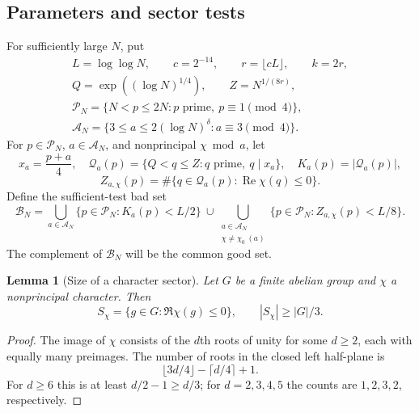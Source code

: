 \documentclass[11pt]{article}
\newtheorem{lemma}[theorem]{Lemma}
\theoremstyle{remark}\newtheorem{remark}[theorem]{Remark}
\newcommand{\cP}{\mathcal P}
\newcommand{\cA}{\mathcal A}
\newcommand{\cQ}{\mathcal Q}
\newcommand{\cB}{\mathcal B}
\begin{document}
\subsection{Parameters and sector tests}
For sufficiently large $N$, put
\begin{equation}\label{eq:parameters}
\begin{gathered}
 L=\log\log N,\qquad c=2^{-14},\qquad r=\lfloor cL\rfloor,\qquad k=2r,\\
 Q=\exp((\log N)^{1/4}),\qquad Z=N^{1/(8r)},\\
 \cP_N=\{N<p\le2N:p\text{ prime},\ p\equiv1\pmod4\},\\
 \cA_N=\{3\le a\le2(\log N)^\delta:a\equiv3\pmod4\}.
\end{gathered}
\end{equation}
For $p\in\cP_N$, $a\in\cA_N$, and nonprincipal $\chi\bmod a$, let
\[
 x_a=\frac{p+a}{4},\quad
 \cQ_a(p)=\{Q<q\le Z:q\text{ prime},\ q\mid x_a\},\quad
 K_a(p)=|\cQ_a(p)|,
\]
\[
 Z_{a,\chi}(p)=\#\{q\in\cQ_a(p):\operatorname{Re}\chi(q)\le0\}.
\]
Define the sufficient-test bad set
\begin{equation}\label{eq:badset}
 \cB_N=
 \bigcup_{a\in\cA_N}\{p\in\cP_N:K_a(p)<L/2\}
 \ \cup\!
 \bigcup_{\substack{a\in\cA_N\\\chi\ne\chi_0\ (a)}}
 \{p\in\cP_N:Z_{a,\chi}(p)<L/8\}.
\end{equation}
The complement of $\cB_N$ will be the common good set.

\begin{lemma}[Size of a character sector]\label{lem:sector}
Let $G$ be a finite abelian group and $\chi$ a nonprincipal character.
Then
\[
 S_\chi=\{g\in G:\Re\chi(g)\le0\},\qquad |S_\chi|\ge|G|/3.
\]
\end{lemma}
\begin{proof}
The image of $\chi$ consists of the $d$th roots of unity for some
$d\ge2$, each with equally many preimages. The number of roots in the
closed left half-plane is
\[
 \lfloor3d/4\rfloor-\lceil d/4\rceil+1.
\]
For $d\ge6$ this is at least $d/2-1\ge d/3$; for $d=2,3,4,5$ the
counts are $1,2,3,2$, respectively.
\end{proof}
\end{document}
